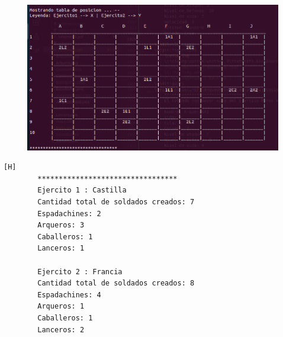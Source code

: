 \documentclass{article}
\begin{document}
	\begin{figure}[H]
		\centering
		\includegraphics[width=1.0\textwidth,keepaspectratio]{img/Commit10.png}
	\end{figure}
	\begin{lstlisting}[language=bash,caption={Ejecucion:}][H]
		*********************************
		Ejercito 1 : Castilla
		Cantidad total de soldados creados: 7
		Espadachines: 2
		Arqueros: 3
		Caballeros: 1
		Lanceros: 1
		
		Ejercito 2 : Francia
		Cantidad total de soldados creados: 8
		Espadachines: 4
		Arqueros: 1
		Caballeros: 1
		Lanceros: 2
		
	\end{lstlisting}
\end{document}
